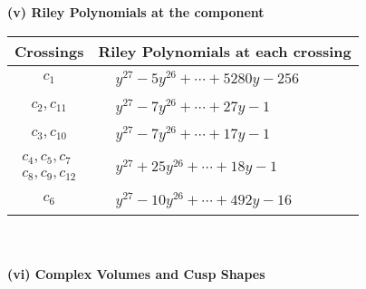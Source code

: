\documentclass[1p]{elsarticle_modified}
\theoremstyle{definition}
\begin{document}
\flushleft \textbf{(v) Riley Polynomials at the component}\newline \\
\begin{tabular}{m{50pt}|m{274pt}}
Crossings & \hspace{64pt}Riley Polynomials at each crossing \\
\hline $$\begin{aligned}c_{1}\end{aligned}$$&$\begin{aligned}
&y^{27}-5 y^{26}+\cdots+5280 y-256
\end{aligned}$\\
\hline $$\begin{aligned}c_{2},c_{11}\end{aligned}$$&$\begin{aligned}
&y^{27}-7 y^{26}+\cdots+27 y-1
\end{aligned}$\\
\hline $$\begin{aligned}c_{3},c_{10}\end{aligned}$$&$\begin{aligned}
&y^{27}-7 y^{26}+\cdots+17 y-1
\end{aligned}$\\
\hline $$\begin{aligned}c_{4},c_{5},c_{7}\\c_{8},c_{9},c_{12}\end{aligned}$$&$\begin{aligned}
&y^{27}+25 y^{26}+\cdots+18 y-1
\end{aligned}$\\
\hline $$\begin{aligned}c_{6}\end{aligned}$$&$\begin{aligned}
&y^{27}-10 y^{26}+\cdots+492 y-16
\end{aligned}$\\
\hline
\end{tabular}\\~\\
\newpage\flushleft \textbf{(vi) Complex Volumes and Cusp Shapes}
\end{document}
